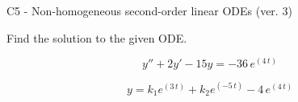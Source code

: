 \begin{exercise}
  \begin{exerciseTitle}C5 - Non-homogeneous second-order linear ODEs (ver. 3)\end{exerciseTitle}
  \begin{exerciseStatement}
    
Find the solution to the given ODE.

    
\[y''+2y'-15y = -36 \, e^{\left(4 \, t\right)}\]

  \end{exerciseStatement}
  \begin{exerciseAnswer}
    
\[y= k_{1} e^{\left(3 \, t\right)} + k_{2} e^{\left(-5 \, t\right)} - 4 \, e^{\left(4 \, t\right)}\]

  \end{exerciseAnswer}
\end{exercise}